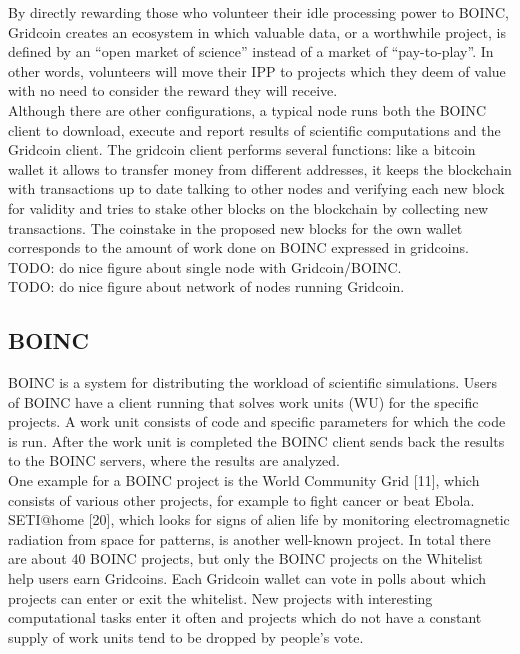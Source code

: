 By directly rewarding those who volunteer their idle processing power to BOINC, Gridcoin creates an ecosystem in which valuable data, or a worthwhile project, is defined by an “open market of science” instead of a market of “pay-to-play”.  In other words, volunteers will move their IPP to projects which they deem of value with no need to consider the reward they will receive.\\

Although there are other configurations, a typical node runs both the BOINC client to download, execute and report results of scientific computations and the Gridcoin client. The gridcoin client performs several functions: like a bitcoin wallet it allows to transfer money from different addresses, it keeps the blockchain with transactions up to date talking to other nodes and verifying each new block for validity and tries to stake other blocks on the blockchain by collecting new transactions. The coinstake in the proposed new blocks for the own wallet corresponds to the amount of work done on BOINC expressed in gridcoins.\\

TODO: do nice figure about single node with Gridcoin/BOINC.\\
TODO: do nice figure about network of nodes running Gridcoin.\\

\subsection{BOINC}

BOINC is a system for distributing the workload of scientific simulations. Users of BOINC have a client running that solves work units (WU) for the specific projects. A work unit consists of code and specific parameters for which the code is run.  After the work unit is completed the BOINC client sends back the results to the BOINC servers, where the results are analyzed.\\

One example for a BOINC project is the World Community Grid [11], which consists of various other projects, for example to fight cancer or beat Ebola. SETI@home [20], which looks for signs of alien life by monitoring electromagnetic radiation from space for patterns, is another well-known project.  In total there are about 40 BOINC projects, but only the BOINC projects on the Whitelist help users earn Gridcoins. Each Gridcoin wallet can vote in polls about which projects can enter or exit the whitelist. New projects with interesting computational tasks enter it often and projects which do not have a constant supply of work units tend to be dropped by people's vote. \\

